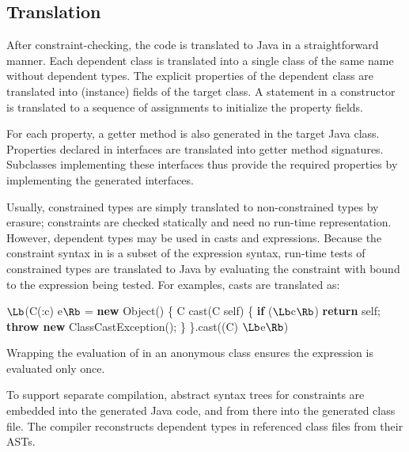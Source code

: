 


\subsection{Translation}

After constraint-checking, the \Xten{} code is translated to
Java in a straightforward manner.  Each dependent class
is translated into a single class of the same name without dependent
types. The explicit properties of the dependent class are translated
into  (instance) fields of the target class.
A  statement in a constructor is translated to a
sequence of assignments to initialize the property fields.

For each property, a getter method is also generated in the
target Java class.
Properties declared in interfaces are translated into getter
method signatures.  Subclasses implementing these interfaces
thus provide the required properties by implementing the
generated interfaces.

Usually, constrained types are simply translated to
non-constrained types by erasure; constraints are checked
statically and need no run-time representation.
However, dependent types may be used in casts
and  expressions.  Because the constraint syntax
in \Xten{} is a subset of the \Xten{} expression syntax, run-time tests
of constrained types are translated to Java
by evaluating the constraint with
 bound to the expression being tested.
For examples, casts are translated as:
\begin{code}
  $\Lb$(C(:c) e$\Rb$ = 
    \textbf{new} Object() \{
      C cast(C self) \{
        \textbf{if} ($\Lb$c$\Rb$) \textbf{return} self;
        \textbf{throw new} ClassCastException(); \}
    \}.cast((C) $\Lb$e$\Rb$)
\end{code}
\noindent Wrapping the evaluation of  in an anonymous class
ensures the expression  is evaluated only once.

To support separate compilation, abstract syntax trees for
constraints are embedded into the generated Java code, and from
there into the generated class file.  The compiler reconstructs
dependent types in referenced class files from their ASTs.

